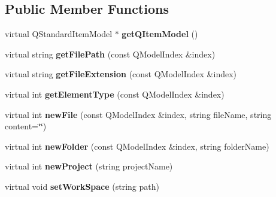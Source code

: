 \subsection*{Public Member Functions}
\begin{DoxyCompactItemize}
\item 
\hypertarget{class_work_space_tree_controller_afe7253948c79c61a693547b9b00b2991}{
virtual QStandardItemModel $\ast$ {\bfseries getQItemModel} ()}
\label{class_work_space_tree_controller_afe7253948c79c61a693547b9b00b2991}

\item 
\hypertarget{class_work_space_tree_controller_ad2ee757e0bb26115a6caf037a2592e2d}{
virtual string {\bfseries getFilePath} (const QModelIndex \&index)}
\label{class_work_space_tree_controller_ad2ee757e0bb26115a6caf037a2592e2d}

\item 
\hypertarget{class_work_space_tree_controller_acc8909ee335da7b89650b56354b4d9e1}{
virtual string {\bfseries getFileExtension} (const QModelIndex \&index)}
\label{class_work_space_tree_controller_acc8909ee335da7b89650b56354b4d9e1}

\item 
\hypertarget{class_work_space_tree_controller_aeaa533e548e8d4bcb7796188533b886b}{
virtual int {\bfseries getElementType} (const QModelIndex \&index)}
\label{class_work_space_tree_controller_aeaa533e548e8d4bcb7796188533b886b}

\item 
\hypertarget{class_work_space_tree_controller_a8e0439fae9df72162352c6d36cc98e70}{
virtual int {\bfseries newFile} (const QModelIndex \&index, string fileName, string content=\char`\"{}\char`\"{})}
\label{class_work_space_tree_controller_a8e0439fae9df72162352c6d36cc98e70}

\item 
\hypertarget{class_work_space_tree_controller_afb446829a06da01058dac02458e8cc2a}{
virtual int {\bfseries newFolder} (const QModelIndex \&index, string folderName)}
\label{class_work_space_tree_controller_afb446829a06da01058dac02458e8cc2a}

\item 
\hypertarget{class_work_space_tree_controller_ad816af67e0d32ce41f006125eabdc6e6}{
virtual int {\bfseries newProject} (string projectName)}
\label{class_work_space_tree_controller_ad816af67e0d32ce41f006125eabdc6e6}

\item 
\hypertarget{class_work_space_tree_controller_a55a446c1edb0bd554d0dc790b03c3bfe}{
virtual void {\bfseries setWorkSpace} (string path)}
\label{class_work_space_tree_controller_a55a446c1edb0bd554d0dc790b03c3bfe}


\end{DoxyCompactItemize}

